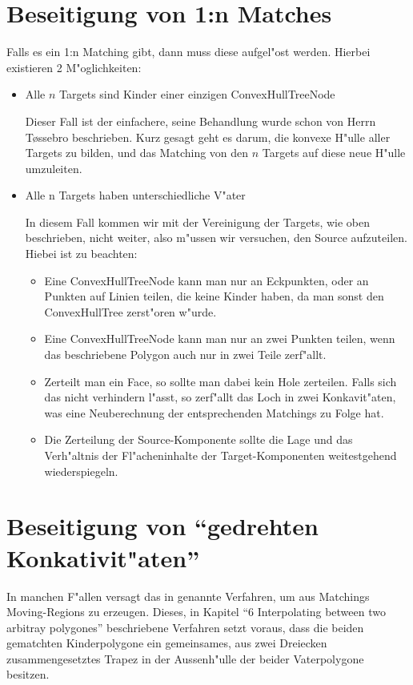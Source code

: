 \documentclass[a4paper,10pt,twoside]{scrreprt}
\begin{document}
\section{Beseitigung von 1:n Matches}

Falls es ein 1:n Matching gibt, dann muss diese aufgel"ost werden. Hierbei existieren 2 M"oglichkeiten:
\begin{itemize}
\item Alle $n$ Targets sind Kinder einer einzigen ConvexHullTreeNode

Dieser Fall ist der einfachere, seine Behandlung wurde schon von Herrn T\o{}ssebro beschrieben. Kurz gesagt geht es darum, die konvexe H"ulle aller Targets zu bilden, und das Matching von den $n$ Targets auf diese neue H"ulle umzuleiten.

\item Alle n Targets haben unterschiedliche V"ater

In diesem Fall kommen wir mit der Vereinigung der Targets, wie oben beschrieben, nicht weiter, also m"ussen wir versuchen, den Source aufzuteilen. Hiebei ist zu beachten:
\begin{itemize}
\item Eine ConvexHullTreeNode kann man nur an Eckpunkten, oder an Punkten auf Linien teilen, die keine Kinder haben, da man sonst den ConvexHullTree zerst"oren w"urde.

\item Eine ConvexHullTreeNode kann man nur an zwei Punkten teilen, wenn das beschriebene Polygon auch nur in zwei Teile zerf"allt.
\nocite{KOP}
\item Zerteilt man ein Face, so sollte man dabei kein Hole zerteilen. Falls sich das nicht verhindern l"asst, so zerf"allt das Loch in zwei Konkavit"aten, was eine Neuberechnung der entsprechenden Matchings zu Folge hat.

\item Die Zerteilung der Source-Komponente sollte die Lage und das Verh"altnis der Fl"acheninhalte der Target-Komponenten weitestgehend wiederspiegeln.

\end{itemize} 
\end{itemize} 
\section{Beseitigung von "`gedrehten Konkativit"aten"'}
In manchen F"allen versagt das in \cite{TG} genannte Verfahren, um aus Matchings Moving-Regions zu erzeugen. Dieses, in Kapitel "`6 Interpolating between two arbitray polygones"' beschriebene Verfahren setzt voraus, dass die beiden gematchten Kinderpolygone ein gemeinsames, aus zwei Dreiecken zusammengesetztes Trapez in der Aussenh"ulle der beider Vaterpolygone besitzen. 
\end{document}
